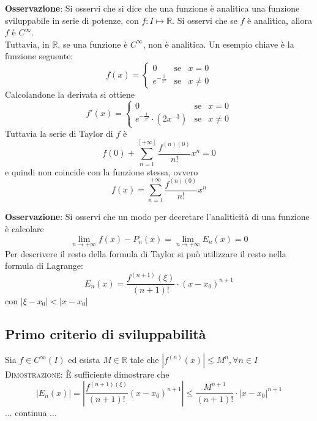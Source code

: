 \documentclass[a4paper]{extarticle}
\begin{document}
\vspace{1em}
\noindent
\textbf{Osservazione}: Si osservi che si dice che una funzione è analitica una funzione sviluppabile in serie di potenze, con $f : I \longmapsto \mathbb{R}$. Si osservi che se $f$ è analitica, allora $f$ è $C^\infty$.\\
Tuttavia, in $\mathbb{R}$, se una funzione è $C^\infty$, non è analitica. Un esempio chiave è la funzione seguente:
\[f(x) = \left\{
    \begin{array}{lll}
        0 & \text{se} & x=0\\
        e^{-\frac{1}{x^2}} & \text{se} & x \neq 0
    \end{array}
\right.\]
Calcolandone la derivata si ottiene
\[f'(x) = \left\{
    \begin{array}{lll}
        0 & \text{se} & x=0\\
        e^{-\frac{1}{x^2}} \cdot (2x^{-3}) & \text{se} & x \neq 0
    \end{array}
\right.\]
Tuttavia la serie di Taylor di $f$ è
\[f(0) + \sum_{n=1}^[+\infty] \frac{f^{(n)(0)}}{n!} x^n = 0\]
e quindi non coincide con la funzione stessa, ovvero
\[f(x) = \sum_{n=1}^{+\infty} \frac{f^{(n)(0)}}{n!} x^n\]

\vspace{1em}
\noindent
\textbf{Osservazione}: Si osservi che un modo per decretare l'analiticità di una funzione è calcolare
\[\lim_{n \to +\infty} f(x) - P_n(x) = \lim_{n \to +\infty} E_n(x) = 0\]
Per descrivere il resto della formula di Taylor si può utilizzare il resto nella formula di Lagrange:
\[E_n(x) = \frac{f^{(n+1)}(\xi)}{(n+1)!} \cdot (x-x_0)^{n+1}\]
con $\left \vert \xi - x_0 \right \vert < \left \vert x - x_0 \right \vert$

\vspace{1em}
\noindent
\subsection{Primo criterio di sviluppabilità}
Sia $f \in C^\infty(I)$ ed esista $M \in \mathbb{R}$ tale che $\left \vert f^{(n)}(x) \right \vert \leq M^n, \forall n \in I$
\vspace{2em}
\noindent
\normalfont \normalsize
\textsc{Dimostrazione}: È sufficiente dimostrare che
\[\left \vert E_n(x) \right \vert = \left \vert \frac{f^{(n+1)(\xi)}}{(n+1)!} (x-x_0)^{n+1} \right \vert \leq \frac{M^{n+1}}{(n+1)!} \cdot \left \vert x - x_0 \right \vert^{n+1}\]
... continua ...
\end{document}
